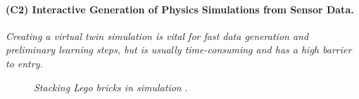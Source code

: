\documentclass{erc-B2}
\begin{document}
\paragraph{(C2) Interactive Generation of Physics Simulations from Sensor Data.} 
\textit{Creating a virtual twin simulation is vital for fast data generation and preliminary learning steps, but is usually time-consuming and has a high barrier to entry.}

\begin{figure}
     \caption{\small \textit{Stacking Lego bricks in simulation \protect\footnotemark}. 
     }
  \label{wrapfig:lego_isaac_sim}
\end{figure}
\end{document}
